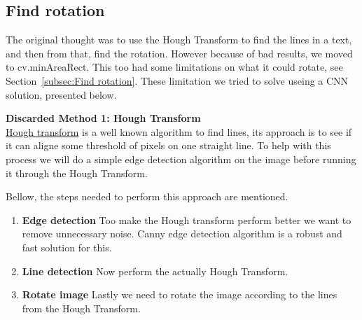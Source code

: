\documentclass[Report.tex]{subfiles}
\begin{document}
\subsection{Find rotation}
\label{Discard:rotation}
The original thought was to use the Hough Transform to find the lines in a text, and then from that, find the rotation. However because of bad results, we moved to cv.minAreaRect. This too had some limitations on what it could rotate, see Section~\ref{subsec:Find rotation}. These limitation we tried to solve useing a CNN solution, presented below.

\begin{flushleft}
  \textbf{Discarded Method 1: Hough Transform} \\
  \href{https://en.wikipedia.org/wiki/Hough_transform}{Hough transform} is a well known algorithm to find lines, its approach is to see if it can aligne some threshold of pixels on one straight line. To help with this process we will do a simple edge detection algorithm on the image before running it through the Hough Transform. \par Bellow, the steps needed to perform this approach are mentioned.

  \begin{enumerate}
    \item \textbf{Edge detection}
    Too make the Hough transform perform better we want to remove unnecessary noise. Canny edge detection algorithm is a robust and fast solution for this.
    \item \textbf{Line detection}
    Now perform the actually Hough Transform.
    \item \textbf{Rotate image}
    Lastly we need to rotate the image according to the lines from the Hough Transform.
  \end{enumerate}
\end{flushleft}
\end{document}
